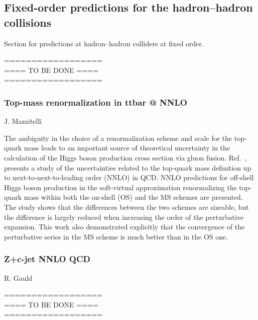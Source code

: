 \documentclass{FBR_Bericht_2025}
\begin{document}
\subsection{Fixed-order predictions for the hadron--hadron collisions}
\begin{refsection}
Section for predictions at hadron--hadron colliders at fixed order.

%
{\color{red} ==================\\ ====\; TO BE DONE\; ====\\ ==================}
%
\subsubsection{Top-mass renormalization in ttbar @ NNLO}
\begin{Namen}
J. Mazzitelli
\end{Namen}


The ambiguity in the choice of a renormalization scheme and scale for
the top-quark mass leads to an important source of theoretical
uncertainty in the calculation of the Higgs boson production cross
section via gluon fusion.  Ref.~\cite{Mazzitelli:2022scc}, presents a
study of the uncertainties related to the top-quark mass definition up
to next-to-next-to-leading order (NNLO) in QCD.  NNLO predictions for
off-shell Higgs boson production in the soft-virtual approximation
renormalizing the top-quark mass within both the on-shell (OS) and the
MS schemes are presented. The study shows that the differences between
the two schemes are sizeable, but the difference is largely reduced
when increasing the order of the perturbative expansion. This work
also demonstrated explicitly that the convergence of the perturbative
series in the MS scheme is much better than in the OS one.


%
%
\subsubsection{Z+c-jet NNLO QCD}
\begin{Namen}
R. Gauld
\end{Namen}
%
{\color{red} ==================\\ ====\; TO BE DONE\; ====\\ ==================}
%


\printbibliography[heading=subbibliography]
\end{refsection}
\end{document}
